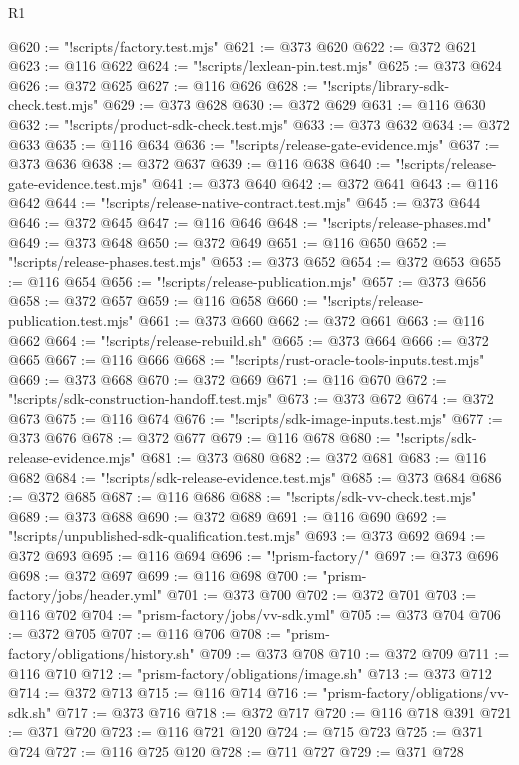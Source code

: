 \begin{lexlean}{R1}
\begin{coremodule}
@620 := "!scripts/factory.test.mjs"
@621 := @373 @620
@622 := @372 @621
@623 := @116 @622
@624 := "!scripts/lexlean-pin.test.mjs"
@625 := @373 @624
@626 := @372 @625
@627 := @116 @626
@628 := "!scripts/library-sdk-check.test.mjs"
@629 := @373 @628
@630 := @372 @629
@631 := @116 @630
@632 := "!scripts/product-sdk-check.test.mjs"
@633 := @373 @632
@634 := @372 @633
@635 := @116 @634
@636 := "!scripts/release-gate-evidence.mjs"
@637 := @373 @636
@638 := @372 @637
@639 := @116 @638
@640 := "!scripts/release-gate-evidence.test.mjs"
@641 := @373 @640
@642 := @372 @641
@643 := @116 @642
@644 := "!scripts/release-native-contract.test.mjs"
@645 := @373 @644
@646 := @372 @645
@647 := @116 @646
@648 := "!scripts/release-phases.md"
@649 := @373 @648
@650 := @372 @649
@651 := @116 @650
@652 := "!scripts/release-phases.test.mjs"
@653 := @373 @652
@654 := @372 @653
@655 := @116 @654
@656 := "!scripts/release-publication.mjs"
@657 := @373 @656
@658 := @372 @657
@659 := @116 @658
@660 := "!scripts/release-publication.test.mjs"
@661 := @373 @660
@662 := @372 @661
@663 := @116 @662
@664 := "!scripts/release-rebuild.sh"
@665 := @373 @664
@666 := @372 @665
@667 := @116 @666
@668 := "!scripts/rust-oracle-tools-inputs.test.mjs"
@669 := @373 @668
@670 := @372 @669
@671 := @116 @670
@672 := "!scripts/sdk-construction-handoff.test.mjs"
@673 := @373 @672
@674 := @372 @673
@675 := @116 @674
@676 := "!scripts/sdk-image-inputs.test.mjs"
@677 := @373 @676
@678 := @372 @677
@679 := @116 @678
@680 := "!scripts/sdk-release-evidence.mjs"
@681 := @373 @680
@682 := @372 @681
@683 := @116 @682
@684 := "!scripts/sdk-release-evidence.test.mjs"
@685 := @373 @684
@686 := @372 @685
@687 := @116 @686
@688 := "!scripts/sdk-vv-check.test.mjs"
@689 := @373 @688
@690 := @372 @689
@691 := @116 @690
@692 := "!scripts/unpublished-sdk-qualification.test.mjs"
@693 := @373 @692
@694 := @372 @693
@695 := @116 @694
@696 := "!prism-factory/"
@697 := @373 @696
@698 := @372 @697
@699 := @116 @698
@700 := "prism-factory/jobs/header.yml"
@701 := @373 @700
@702 := @372 @701
@703 := @116 @702
@704 := "prism-factory/jobs/vv-sdk.yml"
@705 := @373 @704
@706 := @372 @705
@707 := @116 @706
@708 := "prism-factory/obligations/history.sh"
@709 := @373 @708
@710 := @372 @709
@711 := @116 @710
@712 := "prism-factory/obligations/image.sh"
@713 := @373 @712
@714 := @372 @713
@715 := @116 @714
@716 := "prism-factory/obligations/vv-sdk.sh"
@717 := @373 @716
@718 := @372 @717
@720 := @116 @718 @391
@721 := @371 @720
@723 := @116 @721 @120
@724 := @715 @723
@725 := @371 @724
@727 := @116 @725 @120
@728 := @711 @727
@729 := @371 @728

\end{coremodule}
\end{lexlean}
